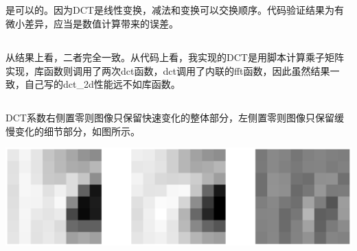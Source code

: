 \documentclass{article}
\begin{document}
\subsection{}
\noindent{}
\par
是可以的。因为DCT是线性变换，减法和变换可以交换顺序。代码验证结果为有微小差异，应当是数值计算带来的误差。
\subsection{}
\noindent{}
\par
从结果上看，二者完全一致。从代码上看，我实现的DCT是用脚本计算乘子矩阵实现，库函数则调用了两次dct函数，dct调用了内联的fft函数，因此虽然结果一致，自己写的dct\_2d性能远不如库函数。
\subsection{}
\noindent{}
\par 
DCT系数右侧置零则图像只保留快速变化的整体部分，左侧置零则图像只保留缓慢变化的细节部分，如图所示。
\par\begin{center}\includegraphics[width=\textwidth]{A3_2_3.eps}\end{center}
\end{document}
